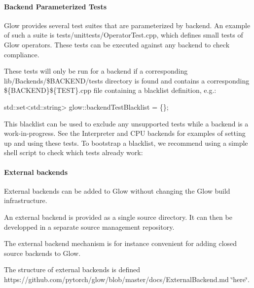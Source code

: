 \paragraph*{Backend Parameterized Tests}

Glow provides several test suites that are parameterized by backend. An example of such a suite is {\ttfamily tests/unittests/\+Operator\+Test.\+cpp}, which defines small tests of Glow operators. These tests can be executed against any backend to check compliance.

These tests will only be run for a backend if a corresponding {\ttfamily lib/\+Backends/\$\+B\+A\+C\+K\+E\+ND/tests} directory is found and contains a corresponding {\ttfamily \$\{B\+A\+C\+K\+E\+ND\}\$\{T\+E\+ST\}.cpp} file containing a blacklist definition, e.\+g.\+: 
\begin{DoxyCode}
std::set<std::string> glow::backendTestBlacklist = \{\};
\end{DoxyCode}


This blacklist can be used to exclude any unsupported tests while a backend is a work-\/in-\/progress. See the Interpreter and C\+PU backends for examples of setting up and using these tests. To bootstrap a blacklist, we recommend using a simple shell script to check which tests already work\+: 


\paragraph*{External backends}

External backends can be added to Glow without changing the Glow build infrastructure.

An external backend is provided as a single source directory. It can then be developped in a separate source management repository.

The external backend mechanism is for instance convenient for adding closed source backends to Glow.

The structure of external backends is defined https\+://github.com/pytorch/glow/blob/master/docs/\+External\+Backend.\+md \char`\"{}here\char`\"{}. 